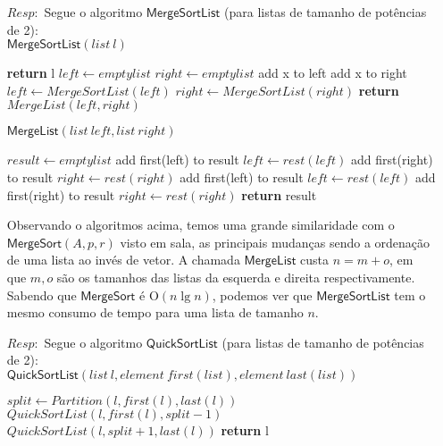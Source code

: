 \documentclass{homework}
\begin{document}
	\begin{enumerate}

\pagebreak	
	
		\item[$Resp:$] Segue o algoritmo $\mathsf{MergeSortList}$ (para listas de tamanho de potências de 2):\\
			$\mathsf{MergeSortList}(list\ l)$
			\begin{algorithmic}[1]
					\textbf{return} l
				\EndIf
				\State $left \gets empty list$
				\State $right \gets empty list$
						\State add x to left
					\Else
						\State add x to right
					\EndIf
				\EndFor
				\State $left \gets MergeSortList(left)$
				\State $right \gets MergeSortList(right)$
				\State \textbf{return} $MergeList(left,right)$
			\end{algorithmic}
			
			$\mathsf{MergeList}(list\ left, list\ right)$
			\begin{algorithmic}[1]
				\State $result \gets empty list$
						\State add first(left) to result
						\State $left \gets rest(left)$
					\Else
						\State add first(right) to result
						\State $right \gets rest(right)$
					\EndIf
				\EndWhile
					\State add first(left) to result
					\State $left \gets rest(left)$
				\EndWhile
					\State add first(right) to result
					\State $right \gets rest(right)$
				\EndWhile
				\State \textbf{return} result
			\end{algorithmic}
		Observando o algoritmos acima, temos uma grande similaridade com o $\mathsf{MergeSort}(A,p,r)$ visto em sala, as principais mudanças sendo a ordenação de uma lista ao invés de vetor. A chamada $\mathsf{MergeList}$ custa $n = m + o$, em que $m,o$ são os tamanhos das listas da esquerda e direita respectivamente.\\
		Sabendo que $\mathsf{MergeSort}$ é O$(n \lg n)$, podemos ver que $\mathsf{MergeSortList}$ tem o mesmo consumo de tempo para uma lista de tamanho $n$.
		\item[$Resp:$] Segue o algoritmo $\mathsf{QuickSortList}$ (para listas de tamanho de potências de 2):\\
		$\mathsf{QuickSortList}(list\ l, element\ first(list), element\ last(list))$
		\begin{algorithmic}[1]
				\State $split \gets Partition(l,first(l),last(l))$
				\State $QuickSortList(l,first(l),split-1)$
				\State $QuickSortList(l,split+1,last(l))$
			\EndIf
			\State \textbf{return} l
		\end{algorithmic}
		

\end{enumerate}
\end{document}
